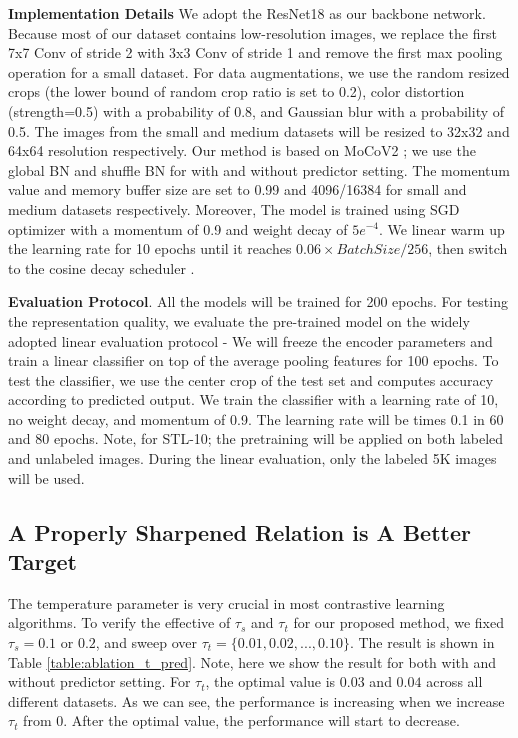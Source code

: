 \documentclass{article}
\newcommand{\<}{\left\langle}
\renewcommand{\>}{\right\rangle}
\begin{document}
\textbf{Implementation Details}
We adopt the ResNet18 \cite{resnet} as our backbone network. Because most of our dataset contains low-resolution images, we replace the first 7x7 Conv of stride 2 with 3x3 Conv of stride 1 and remove the first max pooling operation for a small dataset. For data augmentations, we use the random resized crops (the lower bound of random crop ratio is set to 0.2), color distortion (strength=0.5) with a probability of 0.8, and Gaussian blur with a probability of 0.5. The images from the small and medium datasets will be resized to 32x32 and 64x64 resolution respectively. Our method is based on MoCoV2 \cite{mocov2}; we use the global BN and shuffle BN  for with and without predictor setting. The momentum value and memory buffer size are set to 0.99 and 4096/16384 for small and medium datasets respectively. Moreover, The model is trained using SGD optimizer with a momentum of 0.9 and weight decay of $5e^{-4}$. We linear warm up the learning rate for 10 epochs until it reaches $0.06 \times BatchSize / 256$, then switch to the cosine decay scheduler  \cite{cosine_lr}.


\textbf{Evaluation Protocol}.
All the models will be trained for 200 epochs. For testing the representation quality, we evaluate the pre-trained model on the widely adopted linear evaluation protocol - We will freeze the encoder parameters and train a linear classifier on top of the average pooling features for 100 epochs. To test the classifier, we use the center crop of the test set and computes accuracy according to predicted output. We train the classifier with a learning rate of 10, no weight decay, and momentum of 0.9. The learning rate will be times 0.1 in 60 and 80 epochs. Note, for STL-10; the pretraining will be applied on both labeled and unlabeled images. During the linear evaluation, only the labeled 5K images will be used.







\subsection{A Properly Sharpened Relation is A Better Target}
The temperature parameter is very crucial in most contrastive learning algorithms. To verify the effective of $\tau_s$ and $\tau_t$ for our proposed method, we fixed $\tau_s = 0.1$ or $0.2$, and sweep over $\tau_t = \{0.01, 0.02, ..., 0.10\}$. The result is shown in Table \ref{table:ablation_t_pred}. Note, here we show the result for both with and without predictor setting. For $\tau_t$, the optimal value is $0.03$ and $0.04$ across all different datasets. As we can see, the performance is increasing when we increase $\tau_t$ from $0$. After the optimal value, the performance will start to decrease.
\end{document}
